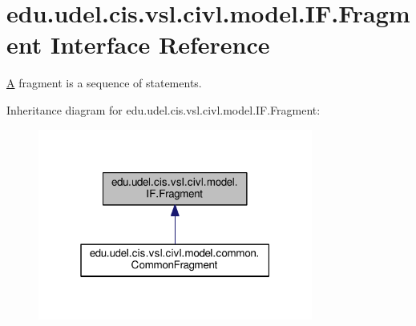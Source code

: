\hypertarget{interfaceedu_1_1udel_1_1cis_1_1vsl_1_1civl_1_1model_1_1IF_1_1Fragment}{}\section{edu.\+udel.\+cis.\+vsl.\+civl.\+model.\+I\+F.\+Fragment Interface Reference}
\label{interfaceedu_1_1udel_1_1cis_1_1vsl_1_1civl_1_1model_1_1IF_1_1Fragment}


\hyperlink{structA}{A} fragment is a sequence of statements.  




Inheritance diagram for edu.\+udel.\+cis.\+vsl.\+civl.\+model.\+I\+F.\+Fragment\+:
\nopagebreak
\begin{figure}[H]
\begin{center}
\leavevmode
\includegraphics[width=256pt]{interfaceedu_1_1udel_1_1cis_1_1vsl_1_1civl_1_1model_1_1IF_1_1Fragment__inherit__graph}
\end{center}
\end{figure}
